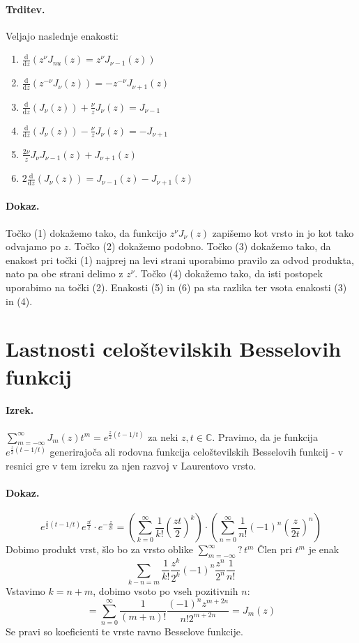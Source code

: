 \documentclass[a4paper]{article}
\newcommand{\dd}[2]{\frac{\mathrm{d} {#1}}{\mathrm{d} {#2}}}
\newcommand{\C}{\mathbb{C}}
\newcommand{\Sum}[2][0]{\sum_{{#2} = {#1}}^{\infty}}
\begin{document}
\paragraph{Trditev.} Veljajo naslednje enakosti:
\begin{enumerate}
    \item $\dd{}{z}\left(z^\nu J_{nu}(z) = z^\nu J_{\nu - 1}(z)\right)$
    \item $\dd{}{z}\left(z^{-\nu} J_{\nu}(z)\right) = -z^{-\nu} J_{\nu + 1} (z)$
    \item $\dd{}{z}(J_\nu(z)) + \frac{\nu}{z}J_\nu(z) = J_{\nu - 1}$
    \item $\dd{}{z}(J_\nu(z)) - \frac{\nu}{z}J_\nu(z) = -J_{\nu + 1}$
    \item $\frac{2\nu}{z} J_{\nu} J_{\nu - 1}(z) + J_{\nu + 1}(z)$
    \item $2\dd{}{z} \left(J_\nu (z)\right) = J_{\nu - 1}(z) - J_{\nu + 1}(z)$
\end{enumerate}
\paragraph{Dokaz.} Točko (1) dokažemo tako, da funkcijo $z^\nu J_\nu(z)$ zapišemo kot vrsto in jo kot tako odvajamo po $z$. Točko (2) dokažemo podobno. Točko (3) dokažemo tako, da enakost pri točki (1) najprej na levi strani uporabimo pravilo za odvod produkta, nato pa obe strani delimo z $z^\nu$.
Točko (4) dokažemo tako, da isti postopek uporabimo na točki (2). Enakosti (5) in (6) pa sta razlika ter vsota enakosti (3) in (4).
\section{Lastnosti celoštevilskih Besselovih funkcij}
\paragraph{Izrek.} $\displaystyle{\Sum[-\infty]{m} J_m(z)t^m = e^{\frac{z}{2}(t - 1/t)}}$ za neki $z, t \in \C$.
Pravimo, da je funkcija $\displaystyle{e^{\frac{z}{2}(t-1/t)}}$ generirajoča
ali rodovna funkcija celoštevilskih Besselovih funkcij - v resnici gre v tem izreku za njen razvoj v Laurentovo vrsto.
\paragraph{Dokaz.}
$$e^{\frac{z}{2}(t-1/t)} e^{\frac{zt}{2}}\cdot e^{-\frac{z}{2t}} = \left(\Sum{k}\frac{1}{k!}\left(\frac{zt}{2}\right)^k\right) \cdot \left(\Sum{n}\frac{1}{n!}(-1)^n\left(\frac{z}{2t}\right)^n\right)$$
Dobimo produkt vrst, šlo bo za vrsto oblike $\displaystyle{\Sum[-\infty]{m} ? \, t^m}$
Člen pri $t^m$ je enak
$$\sum_{k-n=m}\frac{1}{k!}\frac{z^k}{2^k}(-1)^n\frac{z^n}{2^n}\frac{1}{n!}$$
Vstavimo $k=n+m$, dobimo vsoto po vseh pozitivnih $n$:
$$= \Sum{n} \frac{1}{(m+n)!}\frac{(-1)^nz^{m+2n}}{n!2^{m+2n}} = J_m(z)$$
Se pravi so koeficienti te vrste ravno Besselove funkcije.
\end{document}
